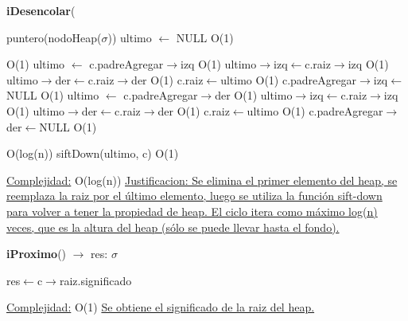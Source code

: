 \begin{Representacion}
\begin{Algoritmos}
\begin{algorithm}[H]{\textbf{iDesencolar}(}
	\begin{algorithmic}[1]

		\State puntero(nodoHeap($\sigma$)) ultimo $\leftarrow$ NULL \Comment O(1)

		 \Comment O(1)
			\State ultimo $\leftarrow$ c.padreAgregar$\rightarrow$izq \Comment O(1)
			\State ultimo$\rightarrow$izq$\leftarrow$c.raiz$\rightarrow$izq \Comment O(1)
			\State ultimo$\rightarrow$der$\leftarrow$c.raiz$\rightarrow$der \Comment O(1)
			\State c.raiz$\leftarrow$ultimo \Comment O(1)
			\State c.padreAgregar$\rightarrow$izq$\leftarrow$NULL \Comment O(1)
		\Else
			\State ultimo $\leftarrow$ c.padreAgregar$\rightarrow$der \Comment O(1)
			\State ultimo$\rightarrow$izq$\leftarrow$c.raiz$\rightarrow$izq \Comment O(1)
			\State ultimo$\rightarrow$der$\leftarrow$c.raiz$\rightarrow$der \Comment O(1)
			\State c.raiz$\leftarrow$ultimo \Comment O(1)
			\State c.padreAgregar$\rightarrow$der$\leftarrow$NULL \Comment O(1)
		\EndIf
		
		 \Comment O(log(n))
			\State siftDown(ultimo, c) \Comment O(1)
		\EndWhile
		
		\medskip
		\Statex \underline{Complejidad:} O(log(n))
			\Statex \underline{Justificacion: Se elimina el primer elemento del heap, se reemplaza la raiz por el último elemento, luego se utiliza la función sift-down para volver a tener la propiedad de heap. El ciclo itera como máximo log(n) veces, que es la altura del heap (sólo se puede llevar hasta el fondo).}   
	\end{algorithmic}
\end{algorithm}


\begin{algorithm}[H]{\textbf{iProximo}() $\to$ res: $\sigma$}
	\begin{algorithmic}[1]
		
		\State res$\leftarrow$c$\rightarrow$raiz.significado
		
		\medskip
		\Statex \underline{Complejidad:} O(1)
			\Statex \underline{Se obtiene el significado de la raiz del heap.}   
	\end{algorithmic}
\end{algorithm}


\end{Algoritmos}
\end{Representacion}
